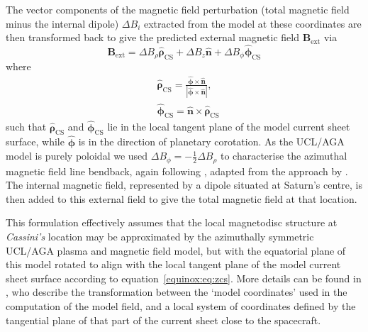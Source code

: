 The vector components of the magnetic field perturbation (total magnetic field minus the internal dipole) $\Delta B_i$ extracted from the model at these coordinates are then transformed back to give the predicted external magnetic field $\boldsymbol{B_\mathrm{ext}}$ via
\begin{equation}\label{equinox:eq:Bext}
\boldsymbol{B_\mathrm{ext}} = \Delta B_\rho \hat{\boldsymbol{\rho}}_\mathrm{CS} + \Delta B_z \hat{\boldsymbol{n}} + \Delta B_\phi \hat{\boldsymbol{\phi}}_\mathrm{CS}
\end{equation}
where
\begin{align}\label{equinox:eq:vectortransform}
& \hat{\boldsymbol{\rho}}_\mathrm{CS} = \frac{\hat{\boldsymbol{\phi}} \times \hat{\boldsymbol{n}}}{| \hat{\boldsymbol{\phi}} \times \hat{\boldsymbol{n}}|}, \nonumber\\
& \hat{\boldsymbol{\phi}}_\mathrm{CS} = \hat{\boldsymbol{n}} \times \hat{\boldsymbol{\rho}}_\mathrm{CS}
\end{align}
such that $\hat{\boldsymbol{\rho}}_\mathrm{CS}$ and $\hat{\boldsymbol{\phi}}_\mathrm{CS}$ lie in the local tangent plane of the model current sheet surface, while $\hat{\boldsymbol{\phi}}$ is in the direction of planetary corotation. As the UCL/AGA model is purely poloidal we used $\Delta B_\phi = -\frac{1}{2} \Delta B_\rho$ to characterise the azimuthal magnetic field line bendback, again following \citet{achilleos2014}, adapted from the approach by \citet{arridge2011}. The internal magnetic field, represented by a dipole situated at Saturn's centre, is  then added to this external field to give the total magnetic field at that location. 

This formulation effectively assumes that the local magnetodisc structure at \textit{Cassini's} location may be approximated by the azimuthally symmetric UCL/AGA plasma and magnetic field model, but with the equatorial plane of this model rotated to align with the local tangent plane of the model current sheet surface according to equation~\ref{equinox:eq:zcs}. More details can be found in {\citet{achilleos2014}}, who describe the transformation between the `model coordinates' used in the computation of the model field, and a local system of coordinates defined by the tangential plane of that part of the current sheet close to the spacecraft.


